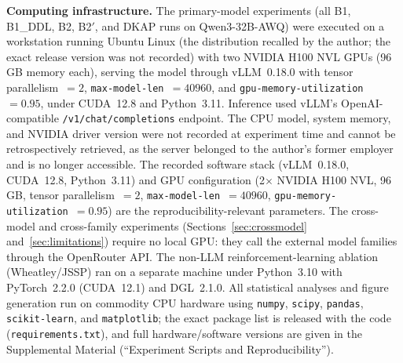 \documentclass[fleqn,10pt,lineno]{wlpeerj}
\begin{document}
\textbf{Computing infrastructure.} The primary-model experiments (all B1, B1\_DDL, B2, B2$'$, and DKAP runs on Qwen3-32B-AWQ) were executed on a workstation running Ubuntu Linux (the distribution recalled by the author; the exact release version was not recorded) with two NVIDIA H100 NVL GPUs (96\,GB memory each), serving the model through vLLM~0.18.0 with tensor parallelism~$=2$, \texttt{max-model-len}~$=40960$, and \texttt{gpu-memory-utilization}~$=0.95$, under CUDA~12.8 and Python~3.11. Inference used vLLM's OpenAI-compatible \texttt{/v1/chat/completions} endpoint. The CPU model, system memory, and NVIDIA driver version were not recorded at experiment time and cannot be retrospectively retrieved, as the server belonged to the author's former employer and is no longer accessible. The recorded software stack (vLLM~0.18.0, CUDA~12.8, Python~3.11) and GPU configuration (2$\times$ NVIDIA H100 NVL, 96\,GB, tensor parallelism~$=2$, \texttt{max-model-len}~$=40960$, \texttt{gpu-memory-utilization}~$=0.95$) are the reproducibility-relevant parameters. The cross-model and cross-family experiments (Sections~\ref{sec:crossmodel} and~\ref{sec:limitations}) require no local GPU: they call the external model families through the OpenRouter API. The non-LLM reinforcement-learning ablation (Wheatley/JSSP) ran on a separate machine under Python~3.10 with PyTorch~2.2.0 (CUDA~12.1) and DGL~2.1.0. All statistical analyses and figure generation run on commodity CPU hardware using \texttt{numpy}, \texttt{scipy}, \texttt{pandas}, \texttt{scikit-learn}, and \texttt{matplotlib}; the exact package list is released with the code (\texttt{requirements.txt}), and full hardware/software versions are given in the Supplemental Material (``Experiment Scripts and Reproducibility'').
\end{document}
